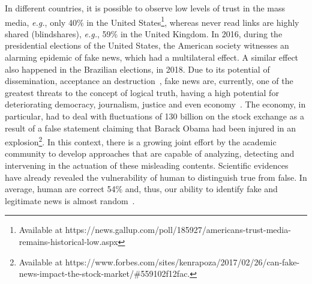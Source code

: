\documentclass{ieeeaccess}
\begin{document}
In different countries, it is possible to observe low levels of trust in the mass media, \textit{e.g.}, only 40\% in the United States\footnote{Available at https://news.gallup.com/poll/185927/americans-trust-media-remains-historical-low.aspx}, whereas never read links are highly shared (blindshares), \textit{e.g.}, 59\% in the United Kingdom. In 2016, during the presidential elections of the United States, the American society witnesses an alarming epidemic of fake news, which had a multilateral effect. A similar effect also happened in the Brazilian elections, in 2018. Due to its potential of dissemination, acceptance an destruction~\cite{science-spread-fakenews}, fake news are, currently, one of the greatest threats to the concept of logical truth, having a high potential for deteriorating democracy, journalism, justice and even economy~\cite{zhou2018fake,wang2017liar}. The economy, in particular, had to deal with fluctuations of 130 billion on the stock exchange as a result of a false statement claiming that Barack Obama had been injured in an explosion\footnote{Available at https://www.forbes.com/sites/kenrapoza/2017/02/26/can-fake-news-impact-the-stock-market/\#559102f12fac.}. In this context, there is a growing joint effort by the academic community to develop approaches that are capable of analyzing, detecting and intervening in the actuation of these misleading contents. Scientific evidences have already revealed the vulnerability of human to distinguish true from false. In average, human are correct 54\% and, thus, our ability to identify fake and legitimate news is almost random~\cite{zhou2018fake,wang2017liar,rubin2010deception,rubin2016fake}. 
\end{document}
